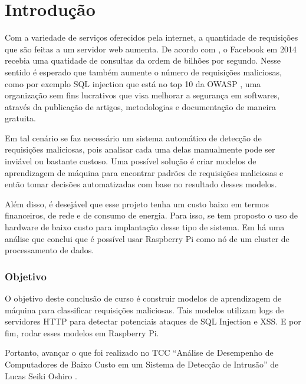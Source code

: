 
\chapter{Introdução}
\label{cap:introducao}

Com a variedade de serviços oferecidos pela internet, a quantidade de requisições
que são feitas a um servidor web aumenta. De acordo com \cite{facebook:topProblems}, o Facebook em 2014 recebia
uma quatidade de consultas da ordem de bilhões por segundo. Nesse sentido é esperado que
também aumente o número de requisições maliciosas, como por exemplo SQL injection que está 
no top 10 da OWASP \cite{owasp:top10}, uma organização sem fins lucrativos que visa melhorar a segurança em 
softwares, através da publicação de artigos, metodologias e documentação de maneira gratuita.

Em tal cenário se faz necessário um sistema automático de detecção de requisições maliciosas, pois analisar cada
uma delas manualmente pode ser inviável ou bastante custoso. Uma possível solução é criar modelos de aprendizagem
de máquina para encontrar padrões de requisições maliciosas e então tomar decisões automatizadas com base no
resultado desses modelos.

Além disso, é desejável que esse projeto tenha um custo baixo em termos financeiros, de rede e
de consumo de energia. Para isso, se tem proposto o uso de hardware de baixo custo para implantação 
desse tipo de sistema. Em \cite{sbrc_estendido:lucas} há uma análise que conclui que é possível usar Raspberry Pi como nó de
um cluster de processamento de dados.

\subsection{Objetivo}

O objetivo deste conclusão de curso é construir modelos de aprendizagem de máquina para classificar
requisições maliciosas. Tais modelos utilizam logs de servidores HTTP para detectar potenciais ataques
de SQL Injection e XSS. E por fim, rodar esses modelos em Raspberry Pi.

Portanto, avançar o que foi realizado no TCC “Análise de Desempenho de Computadores de Baixo Custo em um Sistema de 
Detecção de Intrusão” de Lucas Seiki Oshiro \cite{tcc:lucas}.

